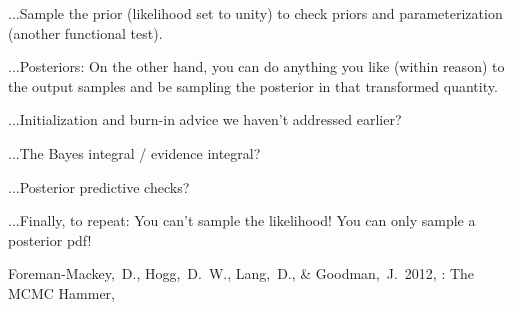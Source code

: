 \documentclass[12pt,twoside,pdftex]{article}
\begin{document}
...Sample the prior (likelihood set to unity) to check priors and parameterization (another functional test).

...Posteriors: On the other hand, you can do anything you like (within
reason) to the output samples and be sampling the posterior in that
transformed quantity.

...Initialization and burn-in advice we haven't addressed earlier?

...The Bayes integral / evidence integral?

...Posterior predictive checks?

...Finally, to repeat: You can't sample the likelihood!  You can only
sample a posterior pdf!


\clearpage
{}\theendnotes

\clearpage
\begin{thebibliography}{}
  Foreman-Mackey,~D., Hogg,~D.~W., Lang,~D., \& Goodman,~J.\ 2012,
  : The MCMC Hammer,
\end{thebibliography}
\end{document}
